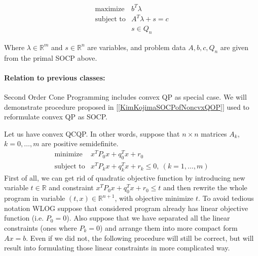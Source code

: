 \documentclass[10pt,oneside]{book}
\theoremstyle{definition}
\begin{document}
\begin{equation}
\label{socd} 
\begin{array}{ll}
\mbox{maximize} & b^T\lambda\\
\mbox{subject to}& A^T\lambda+ s = c\\
& s \in Q_n
\end{array} 
\tag{SOCD}
\end{equation}

Where $\lambda\in \mathbb{R}^m$ and $s\in \mathbb{R}^n$ are variables, and problem data $A,b,c,Q_n$ are given from the  primal SOCP above.

\paragraph{Relation to previous classes:}


Second Order Cone Programming includes convex QP as special case.
We will demonstrate procedure proposed in [\ref{KimKojimaSOCPofNoncvxQOP}] used to reformulate convex QP as SOCP.

Let us have convex QCQP. In other words, suppose that $n\times n$ matrices $A_k$, $k=0,\dots ,m$ are positive semidefinite. 
\begin{equation}
\begin{array}{ll}
\mbox{minimize}& x^TP_0x + q_0^Tx + r_0 \\
\mbox{subject to}& x^TP_kx + q_k^Tx + r_k \leq 0, \  (k = 1,\dots ,m)
\end{array} 
\end{equation}
First of all, we can get rid of quadratic objective function by introducing new variable $t\in \mathbb{R}$ and constraint $x^TP_0x + q_0^Tx +r_0 \leq t$ and then rewrite the whole program in variable $(t,x)\in \mathbb{R}^{n+1}$, with objective minimize $t$. To avoid tedious notation WLOG suppose that considered program already has linear objective function (i.e. $P_0 = 0$).  Also suppose that we have separated all the linear constraints (ones where $P_k = 0$) and arrange them into more compact form $Ax=b$. Even if we did not, the following procedure will still be correct, but will result into formulating those linear constraints in more complicated way.
\end{document}
